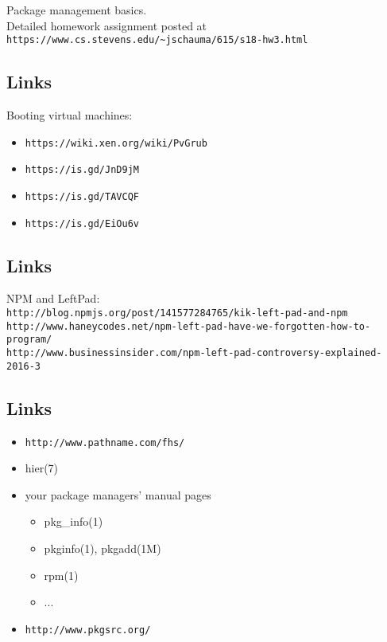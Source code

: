 \documentclass[xga]{xdvislides}
\begin{document}
Package management basics.
\\

Detailed homework assignment posted at
\verb+https://www.cs.stevens.edu/~jschauma/615/s18-hw3.html+

\subsection{Links}
Booting virtual machines:
\begin{itemize}
	\item {\tt https://wiki.xen.org/wiki/PvGrub}
	\item {\tt https://is.gd/JnD9jM}
	\item {\tt https://is.gd/TAVCQF}
	\item {\tt https://is.gd/EiOu6v}
\end{itemize}

\subsection{Links}
NPM and LeftPad: \\
{\tt http://blog.npmjs.org/post/141577284765/kik-left-pad-and-npm} \\
{\tt http://www.haneycodes.net/npm-left-pad-have-we-forgotten-how-to-program/} \\
{\tt http://www.businessinsider.com/npm-left-pad-controversy-explained-2016-3}

\subsection{Links}
\begin{itemize}
	\item \verb+http://www.pathname.com/fhs/+
	\item hier(7)
	\item your package managers' manual pages
		\begin{itemize}
			\item pkg\_info(1)
			\item pkginfo(1), pkgadd(1M)
			\item rpm(1)
			\item ...
		\end{itemize}
	\item \verb+http://www.pkgsrc.org/+
\end{itemize}
\end{document}
